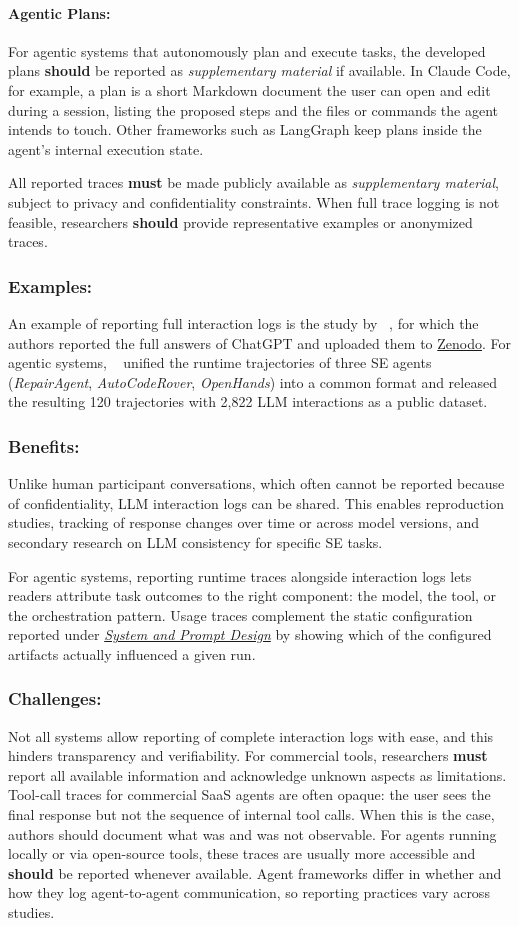 \documentclass[smallextended]{svjour3}
\newcommand{\must}{\textbf{must}\xspace}
\newcommand{\should}{\textbf{should}\xspace}
\newcommand{\supplementarymaterial}{\emph{supplementary material}\xspace}
\newcommand{\supplementarymaterial}{\emph{supplementary material}\xspace}
\newcommand{\design}{\hyperref[sec:report-system-and-prompt-design]{\emph{System and Prompt Design}}\xspace}
\newcommand{\design}{\href{/guidelines\#report-system-and-prompt-design}{\emph{System and Prompt Design}}\xspace}
\newcommand{\guidelinesubsubsection}[1]{\subsubsection{\bfseries #1:}}
\newcommand{\guidelinesubsubsection}[1]{\subsubsection{#1}}
\begin{document}
\paragraph{Agentic Plans:}
For agentic systems that autonomously plan and execute tasks, the developed plans \should be reported as \supplementarymaterial if available.
In Claude Code, for example, a plan is a short Markdown document the user can open and edit during a session, listing the proposed steps and the files or commands the agent intends to touch.
Other frameworks such as LangGraph keep plans inside the agent's internal execution state.

All reported traces \must be made publicly available as \supplementarymaterial, subject to privacy and confidentiality constraints. When full trace logging is not feasible, researchers \should provide representative examples or anonymized traces.

\guidelinesubsubsection{Examples}

An example of reporting full interaction logs is the study by \citeauthor{ronanki2023investigating}~\cite{ronanki2023investigating}, for which the authors reported the full answers of ChatGPT and uploaded them to \href{https://zenodo.org/records/8124936}{Zenodo}.
For agentic systems, \citeauthor{DBLP:conf/kbse/BouzeniaP25}~\cite{DBLP:conf/kbse/BouzeniaP25} unified the runtime trajectories of three SE agents (\emph{RepairAgent}, \emph{AutoCodeRover}, \emph{OpenHands}) into a common format and released the resulting 120 trajectories with 2,822 LLM interactions as a public dataset.

\guidelinesubsubsection{Benefits}

Unlike human participant conversations, which often cannot be reported because of confidentiality, LLM interaction logs can be shared.
This enables reproduction studies, tracking of response changes over time or across model versions, and secondary research on LLM consistency for specific SE tasks.

For agentic systems, reporting runtime traces alongside interaction logs lets readers attribute task outcomes to the right component: the model, the tool, or the orchestration pattern.
Usage traces complement the static configuration reported under \design by showing which of the configured artifacts actually influenced a given run.

\guidelinesubsubsection{Challenges}

Not all systems allow reporting of complete interaction logs with ease, and this hinders transparency and verifiability.
For commercial tools, researchers \must report all available information and acknowledge unknown aspects as limitations.
Tool-call traces for commercial SaaS agents are often opaque: the user sees the final response but not the sequence of internal tool calls.
When this is the case, authors should document what was and was not observable.
For agents running locally or via open-source tools, these traces are usually more accessible and \should be reported whenever available.
Agent frameworks differ in whether and how they log agent-to-agent communication, so reporting practices vary across studies.
\end{document}
